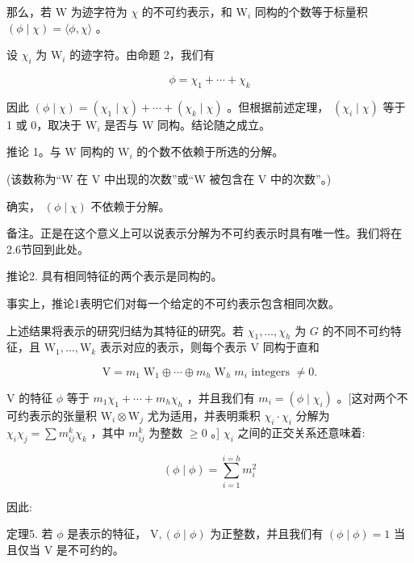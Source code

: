 \documentclass[10pt]{article}
\begin{document}
那么，若 \(\mathrm{W}\) 为迹字符为 \(\chi\) 的不可约表示，和 \({\mathrm{W}}_{i}\) 同构的个数等于标量积 \(\left( {\phi  \mid  \chi }\right)  = \langle \phi ,\chi \rangle\) 。

设 \({\chi }_{i}\) 为 \({\mathrm{W}}_{i}\) 的迹字符。由命题 2，我们有

\[
\phi  = {\chi }_{1} + \cdots  + {\chi }_{k}
\]

因此 \(\left( {\phi  \mid  \chi }\right)  = \left( {{\chi }_{1} \mid  \chi }\right)  + \cdots  + \left( {{\chi }_{k} \mid  \chi }\right)\) 。但根据前述定理， \(\left( {{\chi }_{i} \mid  \chi }\right)\) 等于 1 或 0，取决于 \({\mathrm{W}}_{i}\) 是否与 W 同构。结论随之成立。

推论 1。与 \(\mathrm{W}\) 同构的 \({\mathrm{W}}_{i}\) 的个数不依赖于所选的分解。

(该数称为“W 在 V 中出现的次数”或“W 被包含在 V 中的次数”。)

确实， \(\left( {\phi  \mid  \chi }\right)\) 不依赖于分解。

备注。正是在这个意义上可以说表示分解为不可约表示时具有唯一性。我们将在2.6节回到此处。

推论2. 具有相同特征的两个表示是同构的。

事实上，推论1表明它们对每一个给定的不可约表示包含相同次数。

上述结果将表示的研究归结为其特征的研究。若 \({\chi }_{1},\ldots ,{\chi }_{h}\) 为 \(G\) 的不同不可约特征，且 \({\mathrm{W}}_{1},\ldots ,{\mathrm{W}}_{k}\) 表示对应的表示，则每个表示 \(\mathrm{V}\) 同构于直和

\[
\mathrm{V} = {m}_{1}{\mathrm{\;W}}_{1} \oplus  \cdots  \oplus  {m}_{h}{\mathrm{\;W}}_{h}\;{m}_{i}\text{ integers } \neq  0.
\]

\(\mathrm{V}\) 的特征 \(\phi\) 等于 \({m}_{1}{\chi }_{1} + \cdots  + {m}_{h}{\chi }_{h}\) ，并且我们有 \({m}_{i} = \left( {\phi  \mid  {\chi }_{i}}\right)\) 。[这对两个不可约表示的张量积 \({\mathrm{W}}_{i} \otimes  {\mathrm{W}}_{j}\) 尤为适用，并表明乘积 \({\chi }_{i} \cdot  {\chi }_{i}\) 分解为 \({\chi }_{i}{\chi }_{j} = \sum {m}_{ij}^{k}{\chi }_{k}\) ，其中 \({m}_{ij}^{k}\) 为整数 \(\geq  0\) 。] \({\chi }_{i}\) 之间的正交关系还意味着:

\[
\left( {\phi  \mid  \phi }\right)  = \mathop{\sum }\limits_{{i = 1}}^{{i = h}}{m}_{i}^{2}
\]

因此:

定理5. 若 \(\phi\) 是表示的特征， \(\mathrm{V},\left( {\phi  \mid  \phi }\right)\) 为正整数，并且我们有 \(\left( {\phi  \mid  \phi }\right)  = 1\) 当且仅当 \(\mathrm{V}\) 是不可约的。
\end{document}
